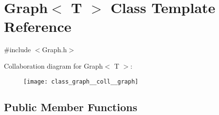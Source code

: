 \hypertarget{class_graph}{\section{Graph$<$ T $>$ Class Template Reference}
\label{class_graph}
}


{\ttfamily \#include $<$Graph.\+h$>$}



Collaboration diagram for Graph$<$ T $>$\+:
\nopagebreak
\begin{figure}[H]
\begin{center}
\leavevmode
\texttt{[image: class\_graph\_\_coll\_\_graph]}
\end{center}
\end{figure}
\subsection*{Public Member Functions}
